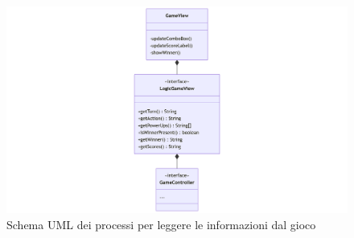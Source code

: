 \documentclass[a4paper,12pt]{report}
\begin{document}
\begin{figure}[H]
	\centering{}
	\includegraphics[width=14cm]{img/TraduzioneInformazioni.png}
	\caption{Schema UML dei processi per leggere le informazioni dal gioco}
	\label{img:Traduzione Informazioni}
\end{figure}

\newpage
\end{document}
